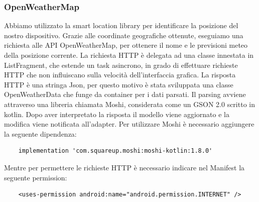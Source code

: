 \documentclass{article}
\begin{document}
\subsubsection{OpenWeatherMap}
Abbiamo utilizzato la smart location library per identificare la posizione del nostro dispositivo.
Grazie alle coordinate geografiche ottenute, eseguiamo una richiesta alle API
OpenWeatherMap, per ottenere il nome e le previsioni meteo della posizione corrente.
La richiesta HTTP è delegata ad una classe innestata in ListFragment, che estende un task asincrono, in grado
di effettuare richieste HTTP che non influiscano sulla velocità dell'interfaccia grafica.
La risposta HTTP è una stringa Json, per questo motivo è stata sviluppata una classe
OpenWeatherData che funge da container per i dati parsati. Il parsing avviene attraverso
una libreria chiamata Moshi, considerata come un GSON 2.0 scritto in kotlin.
Dopo aver interpretato la risposta il modello viene aggiornato e la modifica viene notificata all'adapter.
Per utilizzare Moshi è necessario aggiungere la seguente dipendenza:
\begin{lstlisting}
    implementation 'com.squareup.moshi:moshi-kotlin:1.8.0'
\end{lstlisting}
Mentre per permettere le richieste HTTP è necessario indicare nel Manifest la seguente permission:
\begin{lstlisting}
    <uses-permission android:name="android.permission.INTERNET" />
\end{lstlisting}
\end{document}
